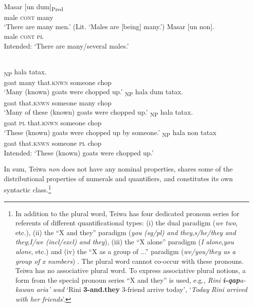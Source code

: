 \ea%
\label{ex:9:29}
 \\
\ea
\gll Masar [un dum]\textsubscript{Pred} \\
    male \textsc{cont} many \\
\glt  `There are many men.' (Lit. `Males are [being] many.')
\ex
\gll *Masar [un non]{.} \\
   male \textsc{cont} \textsc{pl}  \\
\glt  Intended: `There are many/several males.'
\z
\z







\ea%
\label{ex:9:30}
 \\
\ea
{}\textsubscript{NP} hala tatax. \\
   goat many that.\textsc{knwn} someone chop  \\
 \glt `Many (known) goats were chopped up.'
\ex
{}\textsubscript{NP} hala dum tatax. \\
   goat that.\textsc{knwn} someone many chop  \\
\glt `Many of these (known) goats were chopped up.'
\ex
{}\textsubscript{NP} hala tatax. \\
   goat \textsc{pl} that.\textsc{knwn} someone chop  \\
\glt  `These (known) goats were chopped up by someone.'
\ex
{}\textsubscript{NP} hala non tatax \\
   goat that.\textsc{knwn} someone \textsc{pl} chop  \\
\glt  Intended: `These (known) goats were chopped up.'
\z
\z


In sum, Teiwa \textit{non} does not have any nominal properties, shares some of the distributional properties of numerals and quantifiers, and constitutes its own syntactic class.\footnote{  In addition to the plural word, Teiwa has four dedicated pronoun series for referents of different quantificational types: (i) the dual paradigm (\textit{we} \textit{two}, etc.), (ii) the ``X and they'' paradigm (\textit{you (sg/pl) and they},\textit{s/he/they and they};\textit{I/we (incl/excl) and they}), (iii) the ``X alone'' paradigm (\textit{I} \textit{alone},\textit{you} \textit{alone}, etc.) and (iv) the ``X as a group of ...'' paradigm (\textit{we/you/they as a group of x numbers}) \citep[82-85]{Klamer2010grammar}. The plural word cannot co-occur with these pronouns. Teiwa has no associative plural word. To express associative plural notions, a form from the special pronoun series ``X and they'' is used, e.g., \textit{Rini } \textbf{\textit{i-qap}}\textit{a-kawan aria' wad } `Rini \textbf{3-and.they} 3-friend
arrive today',  `\textit{Today} \textit{Rini arrived with her friends}'.}

